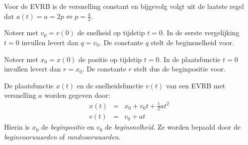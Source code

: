 \documentclass{ximera}
\begin{document}
Voor de EVRB is de versnelling constant en bijgevolg volgt uit de laatste regel dat $a(t)=a=2p\Leftrightarrow p=\frac{a}{2}$. 

Noteer met $v_0=v(0)$ de snelheid op tijdstip $t=0$. In de eerste vergelijking $t=0$ invullen levert dan $q=v_0$. De constante $q$ stelt de beginsnelheid voor. 

Noteer met $x_0=x(0)$ de positie op tijdstip $t=0$. In de plaatsfunctie $t=0$ invullen levert dan $r=x_0$. De constante $r$ stelt dus de beginpositie voor.


\begin{theorem}
De plaatsfunctie $x(t)$ en de snelheidsfunctie $v(t)$ van een EVRB met versnelling $a$ worden gegeven door:
\[
\begin{array}{rcl}
x(t)&=&x_0+v_0t+\frac{1}{2}at^2\\
v(t)&=&v_0+at
\end{array}
\]
Hierin is $x_0$ de \textit{beginpositie} en $v_0$ de \textit{beginsnelheid}. Ze worden bepaald door de \textit{beginvoorwaarden} of \textit{randvoorwaarden}.


\begin{image}[0.5 \textwidth]
\end{image}
\end{theorem}
\end{document}
